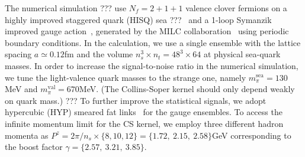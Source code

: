 \documentclass[prd,aps,twocolumn,preprintnumbers, showpacs, nofootinbib,superscriptaddress,notitlepage]{revtex4-1}
\newcommand\bl{\color{blue}}
\begin{document}
The numerical simulation {\bl ??? use $N_f=2+1+1$ valence clover fermions on a  highly improved staggered quark (HISQ) sea ???~\cite{Follana:2006rc} and a 1-loop} Symanzik improved gauge action~\cite{Symanzik:1983dc}, generated by the MILC collaboration~\cite{MILC:2012znn} using periodic boundary conditions. In the calculation, we use a single ensemble with the lattice spacing $a\simeq0.12$fm and the {\bl volume} $n_s^3\times n_t=48^3\times64$ at physical sea-quark masses. In order to increase the signal-to-noise ratio in the numerical simulation, we tune the light-valence quark masses to the strange one, namely $m_{\pi}^{\mathrm{sea}}=130$MeV and  $m_{\pi}^{\mathrm{val}}=670$MeV. {\bl (The Collins-Soper kernel should only depend weakly on quark mass.) ???}  To further improve the statistical signals, we adopt {\bl  hypercubic (HYP) smeared fat links}~\cite{Hasenfratz:2001hp} for the gauge ensembles. To access  the infinite momentum limit for the CS kernel, we employ three different hadron momenta as $P^z=2\pi/n_s\times\{8,10,12\}=\{1.72,~2.15,~2.58\}$GeV  corresponding  to the boost factor $\gamma=\{2.57,~3.21,~3.85\}$. 

\end{document}
